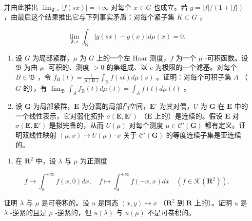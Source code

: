 并由此推出 \(\lim_{\mathfrak{F},s}|f(sx)| = +\infty\) 对每个 \(x \in G\) 也成立。若 \(g = |f| / (1 + |f|)\) ，由最后这个结果推出它与下列事实矛盾：对每个紧子集 \(K \subset G\) ，

\[
\lim _ {\mathfrak {F}, s} \int_ {\mathrm{K}} | g (s x) - g (x) | d \mu (x) = 0.
\]

\begin{enumerate}
\def\labelenumi{\arabic{enumi})}
\setcounter{enumi}{8}
\item
  设 \(G\) 为局部紧群，\(\mu\) 为 \(G\) 上的一个左 Haar 测度，\(f\) 为一个 \(\mu\) -可积函数。设 \(\mathfrak{B}\) 为由 \(\mu\) -可积的、测度 \(> 0\) 的集组成、以 \(e\) 为极限的一个滤基。对每个 \(B \in \mathfrak{B}\) ，令 \(f_{\mathrm{B}}(t) = \frac{1}{\mu(\mathrm{B})} \int_{\mathrm{B}} f(st) d\mu(s)\) 。证明：对每个可积子集 \(A\) （\(G\) 的），有 \(\lim_{\mathfrak{B}} \int_{A} f_{\mathrm{B}}(t) d\mu(t) = \int_{A} f(t) d\mu(t)\) 。
\item
  设 \(\mathbf{G}\) 为局部紧群，\(\mathbf{E}\) 为分离的局部凸空间，\(\mathbf{E}'\) 为其对偶，\(U\) 为 \(\mathbf{G}\) 在 \(\mathbf{E}\) 中的一个线性表示，它对弱化拓扑 \(\sigma(\mathbf{E},\mathbf{E}')\) （\(\mathbf{E}\) 上的）是连续的。假设 \(\mathbf{E}\) 对 \(\sigma(\mathbf{E},\mathbf{E}')\) 是拟完备的，从而 \(U(\mu)\) 对每个测度 \(\mu \in \mathcal{C}'(\mathbf{G})\) 都有定义。证明双线性映射 \((\mu,x) \mapsto U(\mu) \cdot x\) 关于 \(\mathcal{C}'(\mathbf{G})\) 的等度连续子集是亚连续的。
\end{enumerate}

\exercisesection{}

\begin{enumerate}
\def\labelenumi{\arabic{enumi})}
\tightlist
\item
  在 \(\mathbf{R}^2\) 中，设 \(\lambda\) 与 \(\mu\) 为正测度
\end{enumerate}

\[
f \mapsto \int_ {0} ^ {+ \infty} f (x, 0) d x, \quad f \mapsto \int_ {0} ^ {+ \infty} f (- x, x) d x \quad \left(f \in \mathcal {K} (\mathbf {R} ^ {2})\right).
\]

证明 \(\lambda\) 与 \(\mu\) 是可卷积的。设 \(u\) 是同态 \((x,y) \mapsto x\) （\(\mathbf{R}^2\) 到 \(\mathbf{R}\) 上的）。证明 \(u\) 是 \(\lambda\) -逆紧的且是 \(\mu\) -逆紧的，但 \(u(\lambda)\) 与 \(u(\mu)\) 不是可卷积的。

